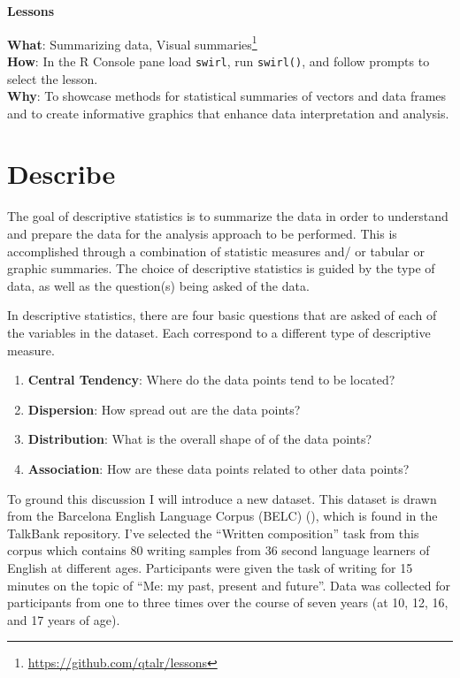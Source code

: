 \documentclass[
  letterpaper,
  DIV=11,
  numbers=noendperiod]{scrreprt}
\providecommand{\tightlist}{%
  \setlength{\itemsep}{0pt}\setlength{\parskip}{0pt}}\usepackage{longtable,booktabs,array}
\theoremstyle{definition}
\theoremstyle{remark}
\DeclareRobustCommand{\href}[2]{#2\footnote{\url{#1}}}
\begin{document}
\begin{tcolorbox}[enhanced jigsaw, leftrule=.75mm, colframe=quarto-callout-color-frame, colback=white, rightrule=.15mm, opacityback=0, arc=.35mm, breakable, bottomrule=.15mm, left=2mm, toprule=.15mm]

\textbf{ Lessons}

\textbf{What}: \href{https://github.com/qtalr/lessons}{Summarizing data,
Visual summaries}\\
\textbf{How}: In the R Console pane load \texttt{swirl}, run
\texttt{swirl()}, and follow prompts to select the lesson.\\
\textbf{Why}: To showcase methods for statistical summaries of vectors
and data frames and to create informative graphics that enhance data
interpretation and analysis.

\end{tcolorbox}

\section{Describe}\label{sec-aa-describe}

The goal of descriptive statistics is to summarize the data in order to
understand and prepare the data for the analysis approach to be
performed. This is accomplished through a combination of statistic
measures and/ or tabular or graphic summaries. The choice of descriptive
statistics is guided by the type of data, as well as the question(s)
being asked of the data.

In descriptive statistics, there are four basic questions that are asked
of each of the variables in the dataset. Each correspond to a different
type of descriptive measure.

\begin{enumerate}
\def\labelenumi{\arabic{enumi}.}
\tightlist
\item
  \textbf{Central Tendency}: Where do the data points tend to be
  located?
\item
  \textbf{Dispersion}: How spread out are the data points?
\item
  \textbf{Distribution}: What is the overall shape of of the data
  points?
\item
  \textbf{Association}: How are these data points related to other data
  points?
\end{enumerate}

To ground this discussion I will introduce a new dataset. This dataset
is drawn from the Barcelona English Language Corpus (BELC)
(), which is found in the TalkBank
repository. I've selected the ``Written composition'' task from this
corpus which contains 80 writing samples from 36 second language
learners of English at different ages. Participants were given the task
of writing for 15 minutes on the topic of ``Me: my past, present and
future''. Data was collected for participants from one to three times
over the course of seven years (at 10, 12, 16, and 17 years of age).
\end{document}
